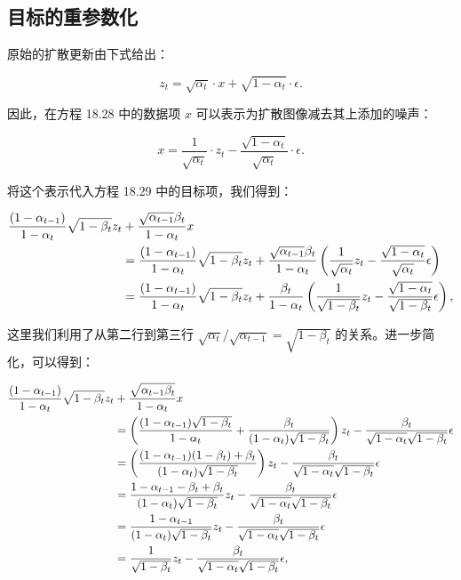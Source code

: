 \documentclass[lang=cn,newtx,10pt,scheme=chinese]{elegantbook}
\begin{document}
\subsection{目标的重参数化}
原始的扩散更新由下式给出：

\begin{equation}
z_t = \sqrt{\alpha_t} \cdot x + \sqrt{1 - \alpha_t} \cdot \epsilon. 
\end{equation}

因此，在方程 18.28 中的数据项 \(x\) 可以表示为扩散图像减去其上添加的噪声：

\begin{equation}
x = \frac{1}{\sqrt{\alpha_t}} \cdot z_t - \frac{\sqrt{1 - \alpha_t}}{\sqrt{\alpha_t}} \cdot \epsilon. 
\end{equation}

将这个表示代入方程 18.29 中的目标项，我们得到：

\begin{align}
\frac{(1 - \alpha_{t-1})}{1 - \alpha_t} \sqrt{1 - \beta_t}z_t &+ \frac{\sqrt{\alpha_{t-1}}\beta_t}{1 - \alpha_t}x  \notag \\
&= \frac{(1 - \alpha_{t-1})}{1 - \alpha_t} \sqrt{1 - \beta_t} z_t + \frac{\sqrt{\alpha_{t-1}}\beta_t}{1 - \alpha_t} \left( \frac{1}{\sqrt{\alpha_t}} z_t - \frac{\sqrt{1 - \alpha_t}}{\sqrt{\alpha_t}} \epsilon \right) \notag \\
&= \frac{(1 - \alpha_{t-1})}{1 - \alpha_t} \sqrt{1 - \beta_t} z_t + \frac{\beta_t}{1 - \alpha_t} \left( \frac{1}{\sqrt{1 - \beta_t}} z_t - \frac{\sqrt{1 - \alpha_t}}{\sqrt{1 - \beta_t}} \epsilon \right), 
\end{align} 


这里我们利用了从第二行到第三行 \(\sqrt{\alpha_t} / \sqrt{\alpha_{t-1}} = \sqrt{1 - \beta_t}\) 的关系。进一步简化，可以得到：

\begin{align}
\frac{(1 - \alpha_{t-1})}{1 - \alpha_t} \sqrt{1 - \beta_t} z_t &+ \frac{\sqrt{\alpha_{t-1}\beta_t}}{1 - \alpha_t} x  \notag \\
&= \left( \frac{(1 - \alpha_{t-1})\sqrt{1 - \beta_t}}{1 - \alpha_t} + \frac{\beta_t}{(1 - \alpha_t)\sqrt{1 - \beta_t}} \right) z_t - \frac{\beta_t}{\sqrt{1 - \alpha_t}\sqrt{1 - \beta_t}} \epsilon \notag \\
&= \left( \frac{(1 - \alpha_{t-1})(1 - \beta_t) + \beta_t}{(1 - \alpha_t)\sqrt{1 - \beta_t}} \right) z_t - \frac{\beta_t}{\sqrt{1 - \alpha_t}\sqrt{1 - \beta_t}} \epsilon \notag \\
&= \frac{1 - \alpha_{t-1} - \beta_t + \beta_t}{(1 - \alpha_t)\sqrt{1 - \beta_t}} z_t - \frac{\beta_t}{\sqrt{1 - \alpha_t}\sqrt{1 - \beta_t}} \epsilon \notag \\
&= \frac{1 - \alpha_{t-1}}{(1 - \alpha_t)\sqrt{1 - \beta_t}} z_t - \frac{\beta_t}{\sqrt{1 - \alpha_t}\sqrt{1 - \beta_t}} \epsilon \notag \\
&= \frac{1}{\sqrt{1 - \beta_t}} z_t - \frac{\beta_t}{\sqrt{1 - \alpha_t}\sqrt{1 - \beta_t}} \epsilon, 
\end{align} 
\end{document}

